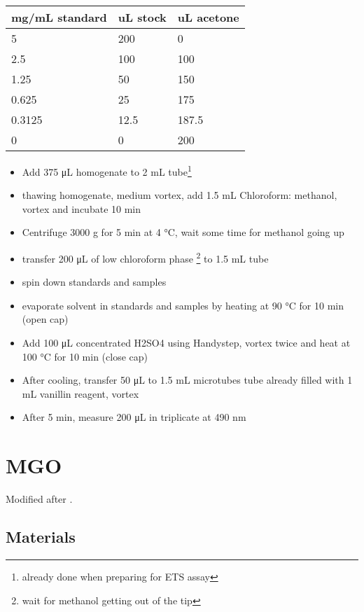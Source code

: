\documentclass[
]{book}
\providecommand{\tightlist}{%
  \setlength{\itemsep}{0pt}\setlength{\parskip}{0pt}}
\begin{document}
\begin{longtable}[]{@{}lll@{}}
\toprule()
mg/mL standard & uL stock & uL acetone \\
\midrule()
\endhead
5 & 200 & 0 \\
2.5 & 100 & 100 \\
1.25 & 50 & 150 \\
0.625 & 25 & 175 \\
0.3125 & 12.5 & 187.5 \\
0 & 0 & 200 \\
\bottomrule()
\end{longtable}

\begin{itemize}
\tightlist
\item
  Add 375 μL homogenate to 2 mL tube\footnote{already done when preparing for ETS assay}
\item
  thawing homogenate, medium vortex, add 1.5 mL Chloroform: methanol, vortex and incubate 10 min
\item
  Centrifuge 3000 g for 5 min at 4 °C, wait some time for methanol going up
\item
  transfer 200 μL of low chloroform phase \footnote{wait for methanol getting out of the tip} to 1.5 mL tube
\item
  spin down standards and samples
\item
  evaporate solvent in standards and samples by heating at 90 °C for 10 min (open cap)
\item
  Add 100 μL concentrated H2SO4 using Handystep, vortex twice and heat at 100 °C for 10 min (close cap)
\item
  After cooling, transfer 50 μL to 1.5 mL microtubes tube already filled with 1 mL vanillin reagent, vortex
\item
  After 5 min, measure 200 μL in triplicate at 490 nm
\end{itemize}

\hypertarget{mgo}{%
\chapter{MGO}\label{mgo}}

Modified after \textcite{mitchel1977}.

\hypertarget{materials-5}{%
\section{Materials}\label{materials-5}}
\end{document}
